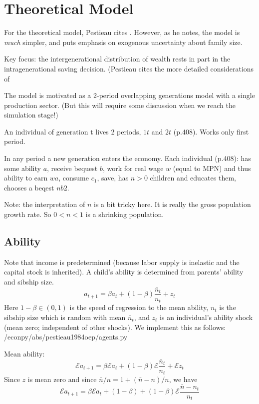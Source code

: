 \documentclass{article}
\newcommand{\E}{\mathcal{E}}
\begin{document}
\section{Theoretical Model}

For the theoretical model, Pestieau cites \citet{becker-1981-treatise}.
However, as he notes, the model is \emph{much} simpler, and puts emphasis on exogenous uncertainty about family size.

Key focus: the intergenerational distribution of wealth rests in part in the intragenerational saving decision.
(Pestieau cites the more detailed considerations of

The model is motivated as a 2-period overlapping generations model with a single production sector.
(But this will require some discussion when we reach the simulation stage!)

An individual of generation t lives 2 periods, $1t$ and $2t$ (p.408).
Works only first period.

In any period a new generation enters the economy.
Each individual (p.408):
has some ability $a$,
receive bequest $b$,
work for real wage $w$ (equal to MPN) and thus ability to earn $wa$,
consume $c_{1}$,
save,
has $n>0$ children and educates them,
chooses a beqest $n b2$.

Note: the interpretation of $n$ is a bit tricky here.
It is really the gross population growth rate.
So $0<n<1$ is a shrinking population.

\subsection{Ability}

Note that income is predetermined (because labor supply is inelastic and
the capital stock is inherited).
A child's ability is determined from parents' ability and sibship size.
\begin{equation}
a_{t+1} = \beta a_{t} + (1-\beta)\frac{\bar{n}_{t}}{n_{t}} + z_{t}
\label{Pestieau3}\tag{Pestieau 3}
\end{equation}
Here $1-\beta \in (0,1)$ is the speed of regression to the mean ability,
$n_{t}$ is the sibship size which is random with mean $\bar{n}_{t}$,
and $z_{t}$ is an individual's ability shock (mean zero; independent of other shocks).
We implement this as follows:
%
{/econpy/abs/pestieau1984oep/agents.py}

Mean ability:
\begin{equation}
\E a_{t+1} = \beta \E a_{t} + (1-\beta) \E\frac{\bar{n}_{t}}{n_{t}} + \E z_{t}
\end{equation}
Since $z$ is mean zero and since $\bar{n}/n = 1 + (\bar{n}-n)/n$, we have
\begin{equation}
\E a_{t+1} = \beta \E a_{t} + (1-\beta) + (1-\beta) \E\frac{\bar{n}-n_{t}}{n_{t}}
\end{equation}
\end{document}
